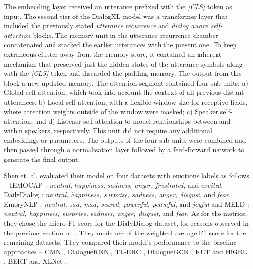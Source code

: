 The embedding layer received an utterance prefixed with the \textit{[CLS]} token as input. The second tier of the DialogXL model was a transformer layer that included the previously stated \textit{utterance recurrence} and \textit{dialog aware self-attention} blocks. The memory unit in the utterance recurrence chamber concatenated and stacked the earlier utterances with the present one. To keep extraneous clutter away from the memory store, it contained an inherent mechanism that preserved just the hidden states of the utterance symbols along with the \textit{[CLS]} token and discarded the padding memory. The output from this block a new-updated memory. The attention segment contained four sub-units: a) Global self-attention, which took into account the context of all previous distant utterances; b) Local self-attention, with a flexible window size for receptive fields, where attention weights outside of the window were masked; c) Speaker self-attention; and d) Listener self-attention to model relationships between and within speakers, respectively. This unit did not require any additional embeddings or parameters. The outputs of the four sub-units were combined and then passed through a normalisation layer followed by a feed-forward network to generate the final output.

Shen et. al. evaluated their model on four datasets with emotions labels as follows -- IEMOCAP \cite{Busso2008IEMOCAPIE} :  \textit{neutral, happiness, sadness, anger, frustrated}, and \textit{excited}, DailyDialog \cite{Li2017DailyDialogAM} : \textit{neutral, happiness, surprise, sadness, anger, disgust}, and \textit{fear}, EmoryNLP \cite{Zahiri2017EmotionDO} : \textit{neutral, sad, mad, scared, powerful, peaceful}, and \textit{joyful} and MELD \cite{Poria2018MELDAM} : \textit{neutral, happiness, surprise, sadness, anger, disgust}, and \textit{fear}. As for the metrics, they chose the micro F1 score for the DialyDialog dataset, for reasons observed in the previous section on \cite{Hazarika2019ConversationalTL}. They made use of the weighted average F1 score for the remaining datasets. They compared their model's performance to the baseline approaches -- CMN \cite{Hazarika2018ConversationalMN}, DialogueRNN \cite{Majumder2018DialogueRNNAA}, TL-ERC \cite{Hazarika2019ConversationalTL}, DialogueGCN \cite{Ghosal2019DialogueGCNAG}, KET \cite{Zhong2019KnowledgeEnrichedTF} and HiGRU \cite{Jiao2019HiGRUHG}, BERT \cite{Devlin2019BERTPO} and XLNet \cite{Yang2019XLNetGA}.


